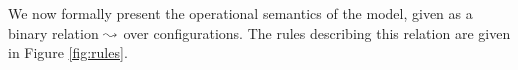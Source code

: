 
    
We now formally present the operational semantics of the \mad model,
given as a binary relation $\leadsto$ over configurations. The rules
describing this relation are given in Figure \ref{fig:rules}.

